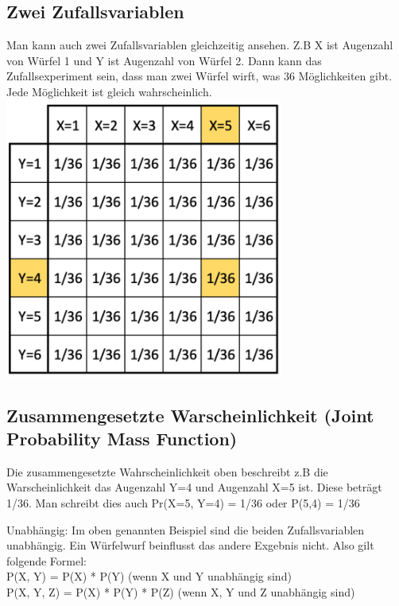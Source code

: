 \subsection{Zwei Zufallsvariablen}
Man kann auch zwei Zufallsvariablen gleichzeitig ansehen. Z.B X ist Augenzahl von Würfel 1 und Y ist Augenzahl von Würfel 2. Dann kann das Zufallsexperiment sein, dass man zwei Würfel wirft, was 36 Möglichkeiten gibt. Jede Möglichkeit ist gleich wahrscheinlich.
\includegraphics[width=\linewidth]{img/zwei_zufallsvariablen.png}

\subsection{Zusammengesetzte Warscheinlichkeit (Joint Probability Mass Function)}
Die zusammengesetzte Wahrscheinlichkeit oben beschreibt z.B die Warscheinlichkeit das Augenzahl Y=4 und Augenzahl X=5 ist. Diese beträgt 1/36. Man schreibt dies auch Pr(X=5, Y=4) = 1/36 oder P(5,4) =  1/36

\textcolor{myblue}{Unabhängig:}
Im oben genannten Beispiel sind die beiden Zufallsvariablen unabhängig. Ein Würfelwurf beinflusst das andere Exgebnis nicht. Also gilt folgende Formel:\\
P(X, Y) = P(X) * P(Y)     (wenn X und Y unabhängig sind)\\
P(X, Y, Z) = P(X) * P(Y) * P(Z)    (wenn X, Y und Z unabhängig sind)

